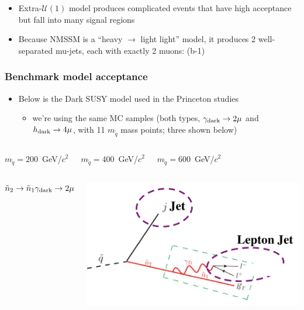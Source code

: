 \documentclass[compress]{beamer}
\newcommand{\s}[1]{{\mbox{\scriptsize #1}}}
\begin{document}
\begin{frame}
\vspace{0.3 cm}
\begin{itemize}
\item Extra-$\mathcal{U}(1)$ model produces complicated events that
  have high acceptance but fall into many signal regions

\item Because NMSSM is a ``heavy $\to$ light light'' model, it produces 2
  well-separated mu-jets, each with exactly 2 muons: (b-1)
\end{itemize}
\end{frame}

\begin{frame}
\frametitle{Benchmark model acceptance}

\begin{itemize}
\item Below is the Dark SUSY model used in the Princeton studies
\begin{itemize}
\item we're using the same MC samples (both types, $\gamma_\s{dark} \to
  2\mu$ and $h_\s{dark} \to 4\mu$, with 11 $m_{\tilde{q}}$ mass
  points; three shown below)
\end{itemize}
\end{itemize}

\vspace{0.2 cm}
\begin{columns}

\centering $m_{\tilde{q}} = 200$~GeV/$c^2$

\centering $m_{\tilde{q}} = 400$~GeV/$c^2$

\centering $m_{\tilde{q}} = 600$~GeV/$c^2$
\end{columns}

\vspace{0.25 cm}
\begin{columns}
\mbox{$\tilde{n}_2 \to \tilde{n}_1 \gamma_\s{dark} \to 2\mu$}

\includegraphics[width=\linewidth]{diagram_squark_2mu.png}


\end{columns}
\end{frame}
\end{document}
